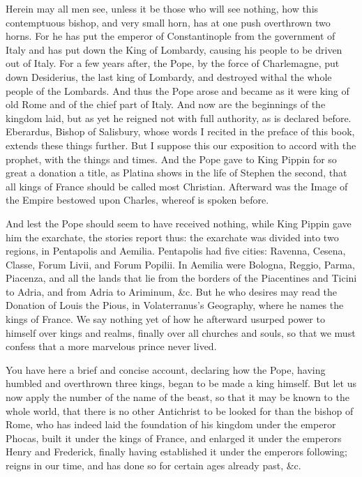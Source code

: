 Herein may all men see, unless it be those who will see nothing, how this contemptuous bishop, and very small horn, has at one push overthrown two horns. For he has put the emperor of Constantinople from the government of Italy and has put down the King of Lombardy, causing his people to be driven out of Italy. For a few years after, the Pope, by the force of Charlemagne, put down Desiderius, the last king of Lombardy, and destroyed withal the whole people of the Lombards. And thus the Pope arose and became as it were king of old Rome and of the chief part of Italy. And now are the beginnings of the kingdom laid, but as yet he reigned not with full authority, as is declared before. Eberardus, Bishop of Salisbury, whose words I recited in the preface of this book, extends these things further. But I suppose this our exposition to accord with the prophet, with the things and times. And the Pope gave to King Pippin for so great a donation a title, as Platina shows in the life of Stephen the second, that all kings of France should be called most Christian. Afterward was the Image of the Empire bestowed upon Charles, whereof is spoken before.

And lest the Pope should seem to have received nothing, while King Pippin gave him the exarchate, the stories report thus: the exarchate was divided into two regions, in Pentapolis and Aemilia. Pentapolis had five cities: Ravenna, Cesena, Classe, Forum Livii, and Forum Popilii. In Aemilia were Bologna, Reggio, Parma, Piacenza, and all the lands that lie from the borders of the Piacentines and Ticini to Adria, and from Adria to Ariminum, \&c. But he who desires may read the Donation of Louis the Pious, in Volaterranus’s Geography, where he names the kings of France. We say nothing yet of how he afterward usurped power to himself over kings and realms, finally over all churches and souls, so that we must confess that a more marvelous prince never lived.

You have here a brief and concise account, declaring how the Pope, having humbled and overthrown three kings, began to be made a king himself. But let us now apply the number of the name of the beast, so that it may be known to the whole world, that there is no other Antichrist to be looked for than the bishop of Rome, who has indeed laid the foundation of his kingdom under the emperor Phocas, built it under the kings of France, and enlarged it under the emperors Henry and Frederick, finally having established it under the emperors following; reigns in our time, and has done so for certain ages already past, \&c.

